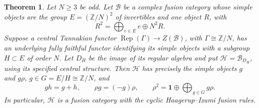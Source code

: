 \documentclass[11pt,a4paper]{article}
\numberwithin{equation}{section}
\newtheorem{theorem}{Theorem}[section]
\theoremstyle{definition}\newtheorem{definition}[theorem]{Definition}
\theoremstyle{remark}\newtheorem{remark}[theorem]{Remark}
\begin{document}
\begin{theorem}\label{thm:cyclic-converse}
Let $N\geq3$ be odd. Let $\mathcal B$ be a complex fusion category
whose simple objects are the group
$E=(\mathbb Z/N)^2$ of invertibles and one object $R$, with
\[
 R^2=\bigoplus_{e\in E}e\oplus N^2R.
\]
Suppose a central Tannakian functor
$\operatorname{Rep}(\Gamma)\to Z(\mathcal B)$, with
$\Gamma\cong\mathbb Z/N$, has an underlying fully faithful functor
identifying its simple objects with a subgroup $H\subset E$ of order
$N$. Let $D_H$ be the image of its regular algebra and put
$\mathcal H=\mathcal B_{D_H}$, using its specified central structure.
Then $\mathcal H$ has precisely the simple objects
$g$ and $g\rho$, $g\in G=E/H\cong\mathbb Z/N$, and
\[
 gh=g+h,\qquad \rho g=(-g)\rho,\qquad
 \rho^2=\mathbf1\oplus\bigoplus_{g\in G}g\rho.
\]
In particular, $\mathcal H$ is a fusion category with the
cyclic Haagerup--Izumi fusion rules.
\end{theorem}
\end{document}
